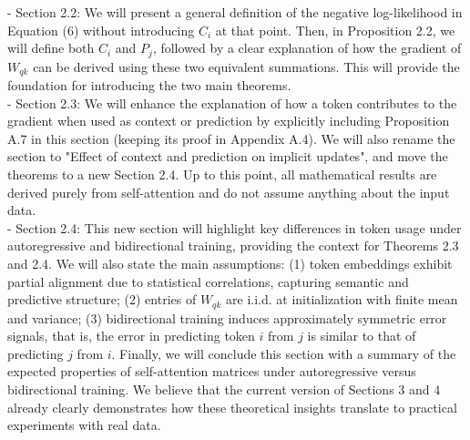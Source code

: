 \documentclass[11pt]{article}
\begin{document}
- Section 2.2: We will present a general definition of the negative log-likelihood in Equation (6) without introducing $C_i$ at that point. Then, in Proposition 2.2, we will define both $C_i$ and $P_j$, followed by a clear explanation of how the gradient of $W_{qk}$ can be derived using these two equivalent summations. This will provide the foundation for introducing the two main theorems. 
%
\\
%
- Section 2.3: We will enhance the explanation of how a token contributes to the gradient when used as context or prediction by explicitly including Proposition A.7 in this section (keeping its proof in Appendix A.4). We will also rename the section to "Effect of context and prediction on implicit updates", and move the theorems to a new Section 2.4. Up to this point, all mathematical results are derived purely from self-attention and do not assume anything about the input data.
%
\\
%
- Section 2.4: This new section will highlight key differences in token usage under autoregressive and bidirectional training, providing the context for Theorems 2.3 and 2.4. We will also state the main assumptions: (1) token embeddings exhibit partial alignment due to statistical correlations, capturing semantic and predictive structure; (2) entries of $W_{qk}$ are i.i.d. at initialization with finite mean and variance; (3) bidirectional training induces approximately symmetric error signals, that is, the error in predicting token $i$ from $j$ is similar to that of predicting $j$ from $i$. 
%
%
Finally, we will conclude this section with a summary of the expected properties of self-attention matrices under autoregressive versus bidirectional training. We believe that the current version of Sections 3 and 4 already clearly demonstrates how these theoretical insights translate to practical experiments with real data.
\end{document}
